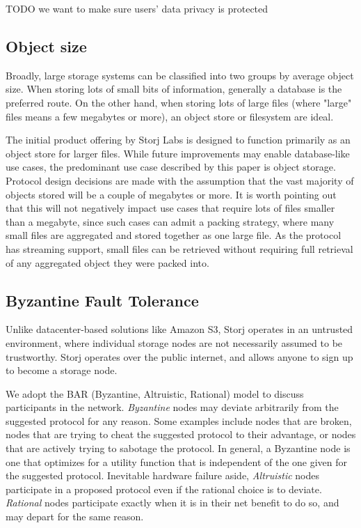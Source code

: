 \documentclass[a4paper,10pt]{article} \usepackage[utf8]{inputenc}
\newcommand{\todo}[1]{{\color{red} TODO #1 }}
\begin{document}
\todo{we want to make sure users' data privacy is protected}

\subsection{Object size}

Broadly, large storage systems can be classified into two groups by average
object size. When storing lots of small bits of information, generally a
database is the preferred route. On the other hand, when storing lots of large
files (where "large" files means a few megabytes or more), an object store or
filesystem are ideal.

The initial product offering by Storj Labs is designed to function primarily as
an object store for larger files. While future improvements may enable
database-like use cases, the predominant use case described by this paper is
object storage. Protocol design decisions are made with the assumption that the
vast majority of objects stored will be a couple of megabytes or more. It is
worth pointing out that this will not negatively impact use cases that require
lots of files smaller than a megabyte, since such cases can admit a packing
strategy, where many small files are aggregated and stored together as one large
file. As the protocol has streaming support, small files can be retrieved
without requiring full retrieval of any aggregated object they were packed into.

\subsection{Byzantine Fault Tolerance}

Unlike datacenter-based solutions like Amazon S3, Storj operates in an untrusted
environment, where individual storage nodes are not necessarily assumed to be
trustworthy. Storj operates over the public internet, and allows anyone to sign
up to become a storage node.

We adopt the BAR (Byzantine, Altruistic, Rational) model \cite{bar} to discuss
participants in the network.
{\em Byzantine} nodes may deviate arbitrarily from the suggested protocol for
any reason. Some examples include nodes that are broken, nodes that are
trying to cheat the suggested protocol to their advantage, or nodes that
are actively trying to sabotage the protocol. In general, a Byzantine node is
one that optimizes for a utility function that is independent of the one
given for the suggested protocol.
Inevitable hardware failure aside, {\em Altruistic} nodes
participate in a proposed protocol even if the rational choice is to deviate.
{\em Rational} nodes participate exactly when it is in their net benefit to do
so, and may depart for the same reason.
\end{document}

